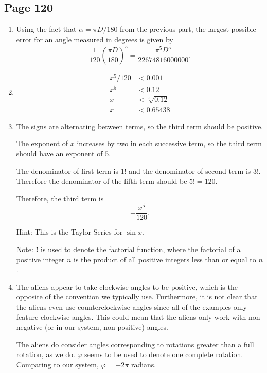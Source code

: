 \documentclass{article}
\newenvironment{solutions}[1]
{\subsection*{#1}
 \begin{enumerate}[leftmargin=1.5em]}
{\end{enumerate}}
\newcommand{\solution}{\item}
\newenvironment{subsolutions}
{\begin{enumerate}}
{\end{enumerate}}
\newcommand{\subsolution}{\item}
\begin{document}
\begin{solutions}{Page 120}
\begin{subsolutions}
\subsolution %
Recall that we can multiply the degree measure of an angle by $\pi/180$ to get the radian measure, so we simply replace $\alpha$ by $\pi D / 180$ in our approximation. This gives
\[
\sin{D} \approx \dfrac{\pi D}{180} - \dfrac{1}{6}\left(\dfrac{\pi D}{180}\right)^{3} = \dfrac{\pi D}{180} - \dfrac{\pi^{3}D^{3}}{34 992 000}
\]

For $D=1\degree$, the above approximation gives $\sin{1\degree} \approx 0.017421$, while the calculator result is $0.017452$. This is an underestimate by $3.1 \times 10^{-5}$.
\end{subsolutions}

\solution %
Using the fact that $\alpha = \pi D/180$ from the previous part, the largest possible error for an angle measured in degrees is given by
\[
\dfrac{1}{120} \left(\dfrac{\pi D}{180}\right)^{5} = \dfrac{\pi^{5}D^{5}}{22 674 816 000 000}.
\]

\solution %
\begin{align*}
    x^5/120 &< 0.001\\
    x^5 &< 0.12\\
x &< \sqrt[5]{0.12}\\
x &< 0.65438
\end{align*}

\solution %
The signs are alternating between terms, so the third term should be positive.

The exponent of $x$ increases by two in each successive term, so the third term should have an exponent of 5.

The denominator of first term is 1! and the denominator of second term is 3!. Therefore the denominator of the fifth term should be $5! = 120$.

Therefore, the third term is \[+\frac{x^5}{120}. \]

Hint: This is the Taylor Series for $\sin{x}$.

Note: \textbf{!} is used to denote the factorial function, where the factorial of a positive integer $n$ is the product of all positive integers less than or equal to $n$.

\solution %
The aliens appear to take clockwise angles to be positive, which is the opposite of the convention we typically use. Furthermore, it is not clear that the aliens even use counterclockwise angles since all of the examples only feature clockwise angles. This could mean that the aliens only work with non-negative (or in our system, non-positive) angles.

The aliens do consider angles corresponding to rotations greater than a full rotation, as we do. $\varphi$ seems to be used to denote one complete rotation. Comparing to our system, $\varphi = -2\pi$ radians.


\end{solutions}
\end{document}

